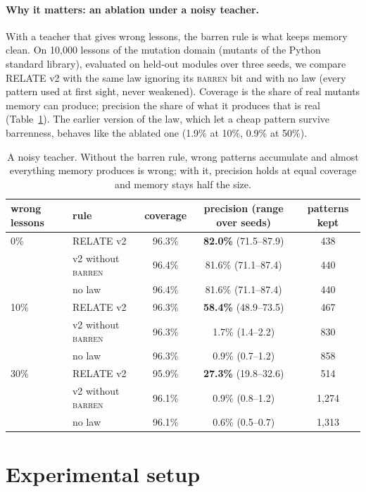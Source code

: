 \documentclass[10pt]{article}
\begin{document}
\paragraph{Why it matters: an ablation under a noisy teacher.} With a teacher that gives wrong lessons, the barren
rule is what keeps memory clean. On 10{,}000 lessons of the mutation domain (mutants of the Python standard library),
evaluated on held-out modules over three seeds, we compare RELATE v2 with the same law ignoring its \textsc{barren} bit
and with no law (every pattern used at first sight, never weakened). Coverage is the share of real mutants memory can
produce; precision the share of what it produces that is real (Table~\ref{tab:noise}). The earlier version of the
law, which let a cheap pattern survive barrenness, behaves like the ablated one (1.9\% at 10\%, 0.9\% at 50\%).

\begin{table}[H]
\centering\small
\begin{tabular}{llccc}
\toprule
wrong lessons & rule & coverage & \textbf{precision} (range over seeds) & patterns kept\\
\midrule
0\% & RELATE v2 & 96.3\% & \textbf{82.0\%} (71.5--87.9) & 438\\
 & v2 without \textsc{barren} & 96.4\% & 81.6\% (71.1--87.4) & 440\\
 & no law & 96.4\% & 81.6\% (71.1--87.4) & 440\\
10\% & RELATE v2 & 96.3\% & \textbf{58.4\%} (48.9--73.5) & 467\\
 & v2 without \textsc{barren} & 96.3\% & 1.7\% (1.4--2.2) & 830\\
 & no law & 96.3\% & 0.9\% (0.7--1.2) & 858\\
30\% & RELATE v2 & 95.9\% & \textbf{27.3\%} (19.8--32.6) & 514\\
 & v2 without \textsc{barren} & 96.1\% & 0.9\% (0.8--1.2) & 1{,}274\\
 & no law & 96.1\% & 0.6\% (0.5--0.7) & 1{,}313\\
\bottomrule
\end{tabular}
\caption{A noisy teacher. Without the barren rule, wrong patterns accumulate and almost everything memory produces is
wrong; with it, precision holds at equal coverage and memory stays half the size.}
\label{tab:noise}
\end{table}

\section{Experimental setup}
\end{document}
